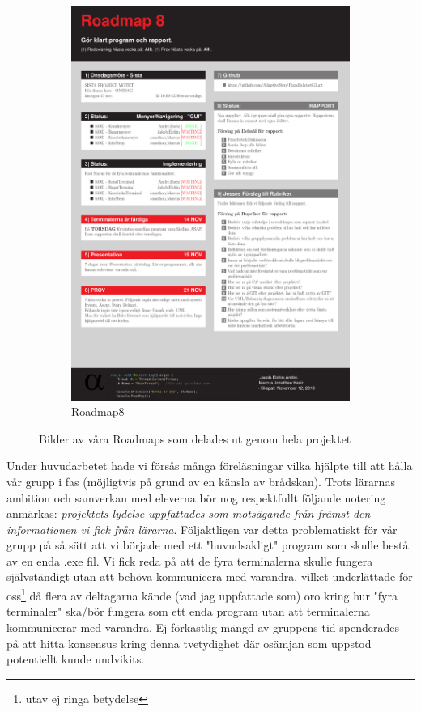 \documentclass{article}
\theoremstyle{remark}                                         %
\begin{document}
\begin{figure}
\begin{subfigure}[b]{0.3\textwidth}
        \includegraphics[width=\textwidth]{img/Roadmap8.pdf}
        \caption{Roadmap8}
        \label{fig:road8}
    \end{subfigure}    
    \caption{Bilder av våra Roadmaps som delades ut genom hela projektet}\label{fig:Roadmaps}
\end{figure}

Under huvudarbetet hade vi försås många föreläsningar vilka hjälpte till att hålla vår grupp i fas (möjligtvis på grund av en känsla av brådskan). Trots lärarnas ambition och samverkan med eleverna bör nog respektfullt följande notering anmärkas: \emph{projektets lydelse uppfattades som motsägande från främst den informationen vi fick från lärarna}. Följaktligen var detta problematiskt för vår grupp på så sätt att vi började med ett "huvudsakligt" program som skulle bestå av en enda .exe fil. Vi fick reda på att de fyra terminalerna skulle fungera självständigt utan att behöva kommunicera med varandra, vilket underlättade för oss\footnote{utav ej ringa betydelse} då flera av deltagarna kände (vad jag uppfattade som) oro kring hur "fyra terminaler" ska/bör fungera som ett enda program utan att terminalerna kommunicerar med varandra. Ej förkastlig mängd av gruppens tid spenderades på att hitta konsensus kring denna tvetydighet där osämjan som uppstod potentiellt kunde undvikits.
\end{document}
